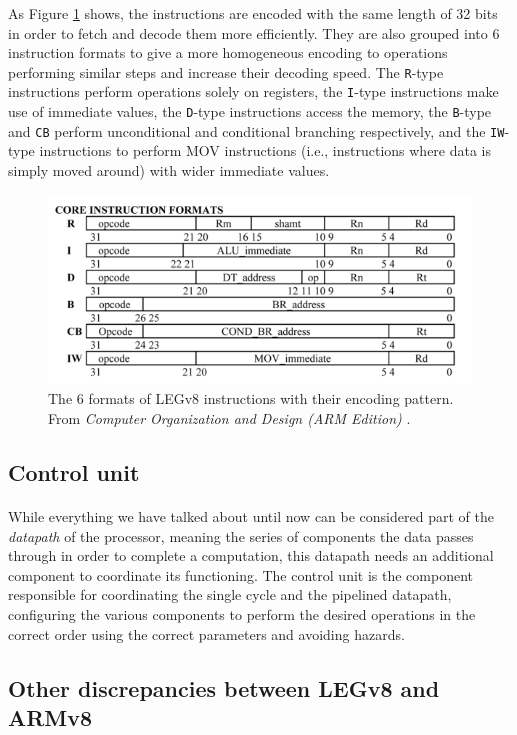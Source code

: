As Figure \ref{fig:legv8instrencod} shows, the instructions are encoded with the same length of 32 bits in order to fetch and decode them more efficiently. They are also grouped into 6 instruction formats to give a more homogeneous encoding to operations performing similar steps and increase their decoding speed.
The \verb|R|-type instructions perform operations solely on registers, the \verb|I|-type instructions make use of immediate values, the \verb|D|-type instructions access the memory, the \verb|B|-type and \verb|CB| perform unconditional and conditional branching respectively, and the \verb|IW|-type instructions to perform MOV instructions (i.e., instructions where data is simply moved around) with wider immediate values.
\begin{figure}[H]
	\centering
	\includegraphics[width=1\textwidth]{img/instruction_types.png}
	\caption{The 6 formats of LEGv8 instructions with their encoding pattern. From \emph{Computer Organization and Design (ARM Edition)} \cite{patterson2016computer}.}
 \label{fig:legv8instrencod}
\end{figure}
\subsection{Control unit}
\paragraph{}
While everything we have talked about until now can be considered part of the \emph{datapath} of the processor, meaning the series of components the data passes through in order to complete a computation, this datapath needs an additional component to coordinate its functioning. The control unit is the component responsible for coordinating the single cycle and the pipelined datapath, configuring the various components to perform the desired operations in the correct order using the correct parameters and avoiding hazards.
\subsection{Other discrepancies between LEGv8 and ARMv8}
